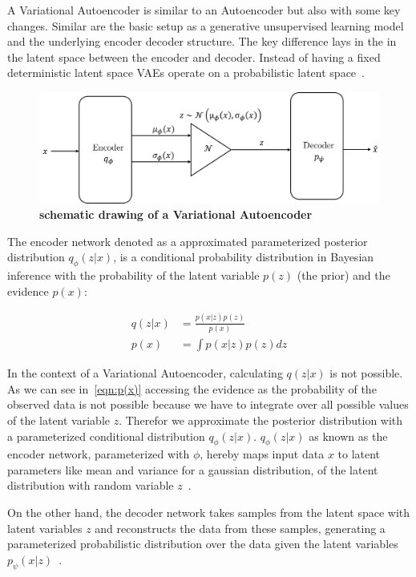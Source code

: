 A Variational Autoencoder is similar to an Autoencoder but also with some key changes. Similar are the basic setup as a generative unsupervised learning model and the underlying encoder decoder structure. The key difference lays in the in the latent space between the encoder and decoder. Instead of having a fixed deterministic latent space VAEs operate on a probabilistic latent space~\cite{pml2Book}.
\begin{figure}
    \centering
    \includegraphics[width=0.7\linewidth]{figures/background/VAE.png}
    \caption[Variational Autoencoder schematics]{\textbf{schematic drawing of a Variational Autoencoder}}
    \label{fig:Variational_Autoencoder_schematics}
\end{figure}

The encoder network denoted as a approximated parameterized posterior distribution $q_\phi(z|x)$, is a conditional probability distribution in Bayesian inference with the probability of the latent variable $p(z)$ (the prior) and the evidence $p(x)$: 

\begin{align}
	q(z|x) &= \frac{p(x|z) p(z)}{p(x)} \label{eqn:Bayesian-inference}\\
	p(x) &= \int p(x|z)p(z) dz \label{eqn:p(x)}
\end{align}

In the context of a Variational Autoencoder, calculating $q(z|x)$ is not possible. As we can see in~\eqref{eqn:p(x)} accessing the evidence as the probability of the observed data is not possible because we have to integrate over all possible values of the latent variable $z$. Therefor we approximate the posterior distribution with a parameterized conditional distribution $q_\phi(z|x)$. $q_\phi(z|x)$ as known as the encoder network, parameterized with $\phi$, hereby maps input data $x$ to latent parameters like mean and variance for a gaussian distribution, of the latent distribution with random variable $z$~\cite{pml2Book}. 

On the other hand, the decoder network takes samples from the latent space with latent variables $z$ and reconstructs the data from these samples, generating a parameterized probabilistic distribution over the data given the latent variables $p_\psi(x|z)$~\cite{pml2Book}.

